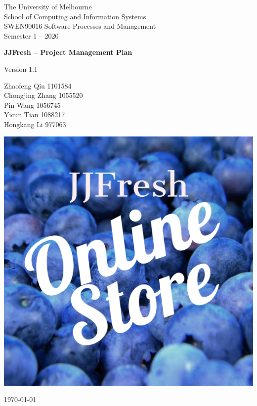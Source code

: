 \documentclass{report}
\begin{document}
\begin{titlepage}
	\clearpage\thispagestyle{empty}
	\centering
	\vspace{1cm}

	{\normalsize The University of Melbourne \\ 
		School of Computing and Information Systems \\
		SWEN90016 Software Processes and Management\\
		Semester 1 – 2020 \par}
	\vspace{3cm}

	{\Huge \textbf{JJFresh -- Project Management Plan}} \\
  \vspace{0.5cm}
	{\normalsize Version 1.1 \par}
	\vspace{2.5cm}
	{\normalsize Zhaofeng Qiu 1101584\\ %
	             Chongjing Zhang 1055520\\
	             Pin Wang 1056745 \\
	             Yicun Tian 1088217 \\
	             Hongkang Li 977063\par}
	\vspace{3cm}
    
  \centering \includegraphics[scale=0.12]{logo.pdf}
  
  \vspace{0.5cm}
		
	{\normalsize \today \par}
	\pagebreak
\end{titlepage}
\end{document}
